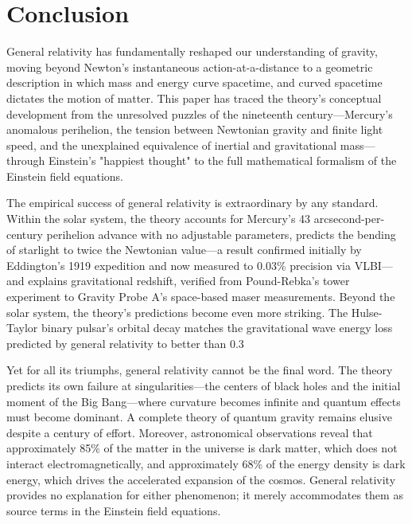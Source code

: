 \documentclass[12pt, a4paper]{article}
\begin{document}
	
	\section{Conclusion}
	General relativity has fundamentally reshaped our understanding of gravity, moving beyond Newton's instantaneous action-at-a-distance to a geometric description in which mass and energy curve spacetime, and curved spacetime dictates the motion of matter. This paper has traced the theory's conceptual development from the unresolved puzzles of the nineteenth century—Mercury's anomalous perihelion, the tension between Newtonian gravity and finite light speed, and the unexplained equivalence of inertial and gravitational mass—through Einstein's "happiest thought" to the full mathematical formalism of the Einstein field equations.
	
	The empirical success of general relativity is extraordinary by any standard. Within the solar system, the theory accounts for Mercury's 43 arcsecond-per-century perihelion advance with no adjustable parameters, predicts the bending of starlight to twice the Newtonian value—a result confirmed initially by Eddington's 1919 expedition and now measured to 0.03\% precision via VLBI—and explains gravitational redshift, verified from Pound-Rebka's tower experiment to Gravity Probe A's space-based maser measurements. Beyond the solar system, the theory's predictions become even more striking. The Hulse-Taylor binary pulsar's orbital decay matches the gravitational wave energy loss predicted by general relativity to better than 0.3%
	
	Yet for all its triumphs, general relativity cannot be the final word. The theory predicts its own failure at singularities—the centers of black holes and the initial moment of the Big Bang—where curvature becomes infinite and quantum effects must become dominant. A complete theory of quantum gravity remains elusive despite a century of effort. Moreover, astronomical observations reveal that approximately 85\% of the matter in the universe is dark matter, which does not interact electromagnetically, and approximately 68\% of the energy density is dark energy, which drives the accelerated expansion of the cosmos. General relativity provides no explanation for either phenomenon; it merely accommodates them as source terms in the Einstein field equations.
	
\end{document}
